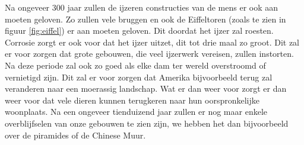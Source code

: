 \newline
Na ongeveer 300 jaar zullen de ijzeren constructies van de mens er ook aan moeten geloven. Zo zullen vele bruggen en ook de Eiffeltoren (zoals te zien in figuur \ref{fig:eiffel}) er aan moeten geloven. Dit doordat het ijzer zal roesten. Corrosie zorgt er ook voor dat het ijzer uitzet, dit tot drie maal zo groot. Dit zal er voor zorgen dat grote gebouwen, die veel ijzerwerk vereisen, zullen instorten. Na deze periode zal ook zo goed als elke dam ter wereld overstroomd of vernietigd zijn. Dit zal er voor zorgen dat Amerika bijvoorbeeld terug zal veranderen naar een moerassig landschap. Wat er dan weer voor zorgt er dan weer voor dat vele dieren kunnen terugkeren naar hun oorspronkelijke woonplaats.
\newline
Na een ongeveer tienduizend jaar zullen er nog maar enkele overblijfselen van onze gebouwen te zien zijn, we hebben het dan bijvoorbeeld over de piramides of de Chinese Muur. \cite{LAPOutbreak}

\newpage
